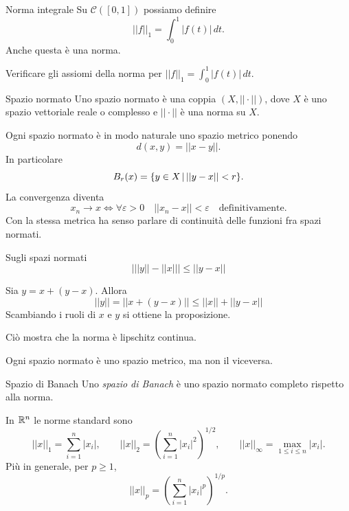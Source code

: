 \documentclass[a4paper]{article}
\begin{document}
\begin{snippetexample}{Norma integrale}
    Su \(\mathcal{C}([0,1])\) possiamo definire
    \[
        ||f||_1=\int_0^1|f(t)|\,dt.
    \]
    Anche questa è una norma.
\end{snippetexample}

\begin{snippetexercise}{}
    Verificare gli assiomi della norma per \(||f||_1=\int_0^1|f(t)|\,dt\).
\end{snippetexercise}

\begin{snippetdefinition}{Spazio normato}
    Uno spazio normato è una coppia \((X,||\cdot||)\), dove \(X\) è uno spazio vettoriale
    reale o complesso e \(||\cdot||\) è una norma su \(X\).
\end{snippetdefinition}

Ogni spazio normato è in modo naturale uno spazio metrico ponendo
\[
    d(x,y)=||x-y||.
\]
In particolare
\[
    B_r(x)=\{y\in X\,|\, ||y-x||<r\}.
\]
La convergenza diventa
\[
    x_n\to x
    \iff
    \forall\varepsilon>0\quad ||x_n-x||<\varepsilon
    \quad\text{definitivamente}.
\]
Con la stessa metrica ha senso parlare di continuità delle funzioni fra spazi normati.

\begin{snippetlemma}{Sugli spazi normati}
    \[
        \left|
            ||y|| - ||x||
        \right|
        \leq ||y-x||
    \]
\end{snippetlemma}

\begin{snippetproof}{}
    Sia \(y = x + (y-x)\). Allora
    \[
        ||y|| = ||x + (y-x)|| \leq
        ||x|| + ||y-x||
    \]
    Scambiando i ruoli di \(x\) e \(y\) si ottiene la proposizione.
\end{snippetproof}

Ciò mostra che la norma è lipschitz continua.

Ogni spazio normato è uno spazio metrico, ma non il viceversa.

\begin{snippetdefinition}{Spazio di Banach}
    Uno \emph{spazio di Banach} è uno spazio normato
    completo rispetto alla norma.
\end{snippetdefinition}

In \(\mathbb{R}^n\) le norme standard sono
\[
    ||x||_1=\sum_{i=1}^n|x_i|,
    \qquad
    ||x||_2=\left(\sum_{i=1}^n|x_i|^2\right)^{1/2},
    \qquad
    ||x||_\infty=\max_{1\leq i\leq n}|x_i|.
\]
Più in generale, per \(p\geq1\),
\[
    ||x||_p=\left(\sum_{i=1}^n|x_i|^p\right)^{1/p}.
\]
\end{document}

